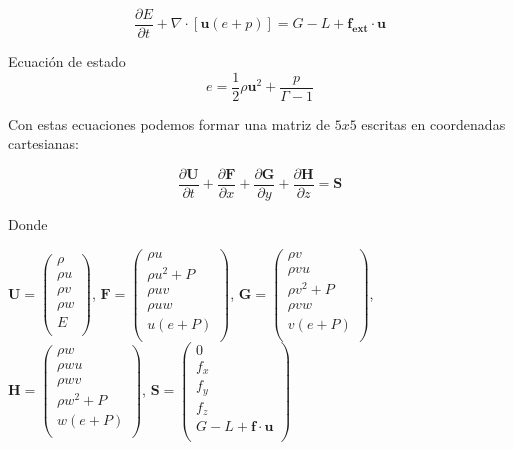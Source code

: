 \documentclass[12pt,a4paper]{book}
\begin{document}
\begin{equation} \label{conservacion_energia_hidrodinamica}
\dfrac{\partial E }{\partial t} + \nabla \cdot \left[ \mathbf{u} \left( e+p \right) \right] =G-L+\mathbf{f_{ext} \cdot \mathbf{u}}
\end{equation}

Ecuación de estado
\begin{equation}
e=\frac{1}{2} \rho \mathbf{u}^{2} + \frac{p}{\Gamma - 1}
\end{equation}

Con estas ecuaciones podemos formar una matriz de $5x5$ escritas en coordenadas cartesianas:

\begin{equation} \label{euler_cartesianas}
\dfrac{\partial \mathbf{U}}{\partial t}+\dfrac{\partial \mathbf{F}}{\partial x}+\dfrac{\partial \mathbf{G}}{\partial y}+\dfrac{\partial \mathbf{H}}{\partial z}= \mathbf{S}
\end{equation}

Donde
\begin{center}


$\mathbf{U}=
\left(\begin{smallmatrix}
\rho \\
\rho u \\
\rho v \\
\rho w \\
E \\
\end{smallmatrix}\right)
$,
$\mathbf{F} =
\left(\begin{smallmatrix}
\rho u \\
\rho u^{2}+P \\
\rho uv \\
\rho uw \\
u(e+P) \\
\end{smallmatrix}\right)
$,
$\mathbf{G} =
\left(\begin{smallmatrix}
\rho v\\
\rho vu \\
\rho v^{2}+P \\
\rho vw \\
v(e+P) \\
\end{smallmatrix}\right)
$,
$\mathbf{H} =
\left(\begin{smallmatrix}
\rho w\\
\rho wu \\
\rho wv \\
\rho w^{2}+P \\
w(e+P) \\
\end{smallmatrix}\right)
$, 
$\mathbf{S} =
\left(\begin{smallmatrix}
0 \\
f_{x} \\
f_{y} \\
f_{z} \\
G-L+\textbf{f} \cdot \textbf{u} \\
\end{smallmatrix}\right)
$
\end{center}
\end{document}
